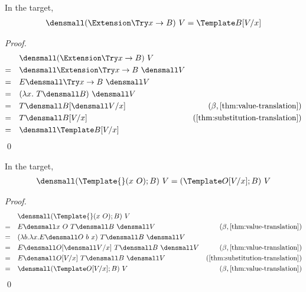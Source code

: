 \begin{lemma}
  \label{thm:ext-try}
  In the target,
  \begin{align*}
    \den{(\Extension \Try x \to B) ~ V} = \Template B\subst{x}{V}
  \end{align*}
\end{lemma}
\begin{proof}
  \begin{align*}
    &\quad \den{(\Extension \Try x \to B) ~ V}  \\
    =& \quad \den{\Extension \Try x \to B} ~ \den{V}\\
    =& \quad E\den{\Try x \to B} ~ \den{V}\\
    =& \quad (\lambda x. ~T\den{B}) ~ \den{V}\\
    =& \quad T\den{B}\subst{x}{\den{V}} &(\beta, \cref{thm:value-translation}) \\
    =& \quad T\den{B\subst{x}{V}} &(\cref{thm:substitution-translation}) \\
    =& \quad \den{\Template B\subst{x}{V}}
  \end{align*}
  \qed
\end{proof}

\begin{lemma}
  \label{thm:template-self}
  In the target,
  \begin{align*}
    \den{(\Template{} (x ~ O); B) ~ V = (\Template O\subst{x}{V}; B) ~ V} 
  \end{align*}
\end{lemma}
\begin{proof}
  \begin{align*}
    &\quad
    \den{(\Template{} (x ~ O); B) ~ V}
    \\
    =&\quad
    E\den{x ~ O} ~ T\den{B} ~ \den{V}
    &(\beta, \cref{thm:value-translation})
    \\
    =&\quad
    (\lambda b. \lambda x. E\den{O} ~ b ~ x) ~ T\den{B} ~ \den{V}
    \\
    =&\quad
    E\den{O}\subst{x}{\den{V}} ~ T\den{B} ~ \den{V}
    &(\beta, \cref{thm:value-translation})
    \\
    =&\quad
    E\den{O\subst{x}{V}} ~ T\den{B} ~ \den{V}
    &(\cref{thm:substitution-translation})
    \\
    =&\quad
    \den{(\Template O\subst{x}{V}; B) ~ V}
    &(\beta, \cref{thm:value-translation})
  \end{align*}
  \qed
\end{proof}


